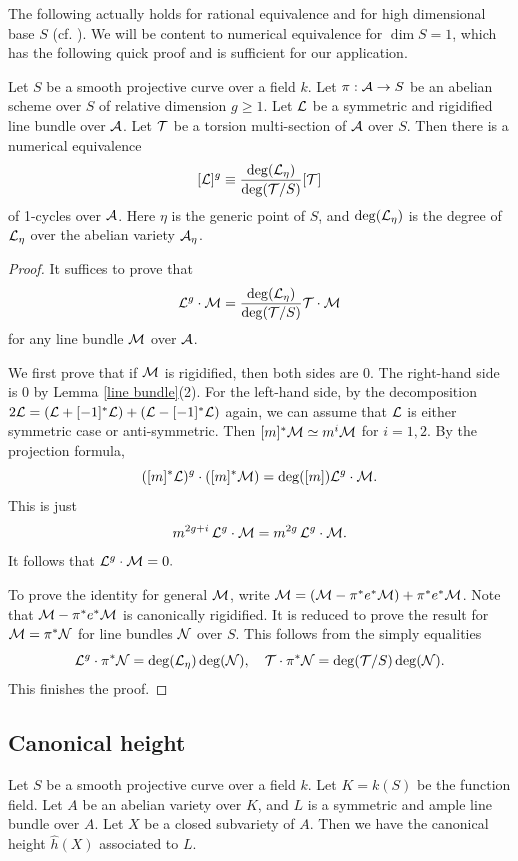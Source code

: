\documentclass[12pt]{amsart}
\begin{document}
The following actually holds for rational equivalence and for high dimensional base $S$ (cf. \cite[Theorem 2.1]{GZ2014}). 
We will be content to numerical equivalence for $\dim S=1$, which has the following quick proof and is sufficient for our application.

\begin{pro} \label{numerical equivalent}
Let $S$ be a smooth projective curve over a field $k$. 
Let $\pi:{\mathcal A}\to S$ be an abelian scheme over $S$ of relative dimension $g\geq 1$.
Let ${\mathcal L}$ be a symmetric and rigidified line bundle over ${\mathcal A}$. 
Let ${\mathcal T}$ be a torsion multi-section of ${\mathcal A}$ over $S$. 
Then there is a numerical equivalence 
$$[{\mathcal L}]^g\equiv
\frac{\deg({\mathcal L}_\eta)}{\deg({\mathcal T}/S)} [{\mathcal T}]$$ 
of 1-cycles over ${\mathcal A}$. 
Here $\eta$ is the generic point of $S$, and $\deg({\mathcal L}_\eta)$ is the degree of ${\mathcal L}_\eta$ over the abelian variety ${\mathcal A}_\eta$. 
\end{pro}

\begin{proof}
It suffices to prove that 
$${\mathcal L}^g\cdot {\mathcal M}=
\frac{\deg({\mathcal L}_\eta)}{\deg({\mathcal T}/S)} {\mathcal T}\cdot {\mathcal M}$$ 
for any line bundle ${\mathcal M}$ over ${\mathcal A}$. 

We first prove that if ${\mathcal M}$ is rigidified, then both sides are 0. 
The right-hand side is 0 by Lemma \ref{line bundle}(2).
For the left-hand side, by the decomposition $2{\mathcal L}=({\mathcal L}+[-1]^*{\mathcal L})+({\mathcal L}-[-1]^*{\mathcal L})$ again, we can assume that ${\mathcal L}$ is either symmetric case or anti-symmetric. 
Then $[m]^*{\mathcal M}\simeq m^i{\mathcal M}$ for $i=1,2$.
By the projection formula, 
$$([m]^*{\mathcal L})^g\cdot ([m]^*{\mathcal M})= 
\deg([m]) {\mathcal L}^g\cdot {\mathcal M}.$$ 
This is just 
$$m^{2g+i} \,{\mathcal L}^g\cdot {\mathcal M}= 
m^{2g}\, {\mathcal L}^g\cdot {\mathcal M}.$$ 
It follows that ${\mathcal L}^g\cdot {\mathcal M}=0.$

To prove the identity for general ${\mathcal M}$, write ${\mathcal M}=({\mathcal M}-\pi^*e^*{\mathcal M})+\pi^*e^*{\mathcal M}$. Note that ${\mathcal M}-\pi^*e^*{\mathcal M}$ is canonically rigidified. It is reduced to prove the result for ${\mathcal M}=\pi^*{\mathcal N}$ for line bundles ${\mathcal N}$
over $S$. This follows from the simply equalities
$${\mathcal L}^g\cdot \pi^*{\mathcal N}=\deg({\mathcal L}_\eta)\deg({\mathcal N}),\quad
{\mathcal T}\cdot \pi^*{\mathcal N}=\deg({\mathcal T}/S)\deg({\mathcal N}).$$ 
This finishes the proof.
\end{proof}



\subsection{Canonical height}

Let $S$ be a smooth projective curve over a field $k$. 
Let $K=k(S)$ be the function field. 
Let $A$ be an abelian variety over $K$, and $L$ is a symmetric and ample line bundle over $A$.
Let $X$ be a closed subvariety of $A$. 
Then we have the canonical height $\hat h(X)$ associated to $L$. 
\end{document}
